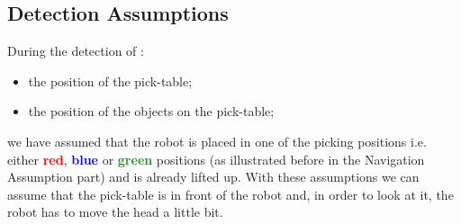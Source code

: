 \subsection{Detection Assumptions}
During the detection of : 
\begin{itemize}
    \item the position of the pick-table;
    \item the position of the objects on the pick-table;    
\end{itemize}
we have assumed that the robot is placed in one of the picking positions i.e. either \textbf{\textcolor{red}{red}}, \textbf{\textcolor{blue}{blue}} or \textbf{\textcolor{ForestGreen} {green}} positions (as illustrated before in the Navigation Assumption part) and is already lifted up. With these assumptions we can assume that the pick-table is in front of the robot and, in order to look at it, the robot has to move the head a little bit.